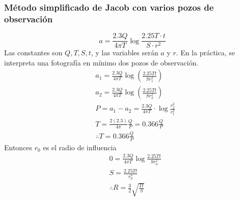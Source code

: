 \subsubsection{Método simplificado de Jacob con varios pozos de observación}
\begin{equation}
    a = \frac{2.3 Q}{4\pi T} \log{\frac{2.25T \cdot t}{S \cdot r^2}} 
\end{equation}
Las constantes son $Q,T,S,t$, y las variables serán $a$ y $r$.
En la práctica, se interpreta una fotografía en mínimo dos pozos de observación.
\begin{align*}
    &a_1 = \frac{2.3Q}{4\pi T}\log{\left(\frac{2.25Tt}{Sr_1^2}\right)}\\
    &a_2 = \frac{2.3Q}{4\pi T}\log{\left(\frac{2.25Tt}{Sr_2^2}\right)}\\
    &P = a_1 - a_2 = \frac{2.3Q}{4\pi T} \cdot \log{\frac{r^2_2}{r^2_1}}\\
    &T = \frac{2(2.3)}{4\pi} \frac{Q}{P} = 0.366 \frac{Q}{P}\\
    &\therefore T = 0.366 \frac{Q}{P}
\end{align*}
Entonces $r_0$ es el radio de influencia
\begin{align*}
    &0 = \frac{2.3Q}{4\pi T} \log{\frac{2.25Tt}{Sr_0^2}}\\
    &S = \frac{2.25Tt}{r_0^2}\\
    &\therefore R = \frac{3}{2}\sqrt{\frac{Tt}{S}}\\
\end{align*}
